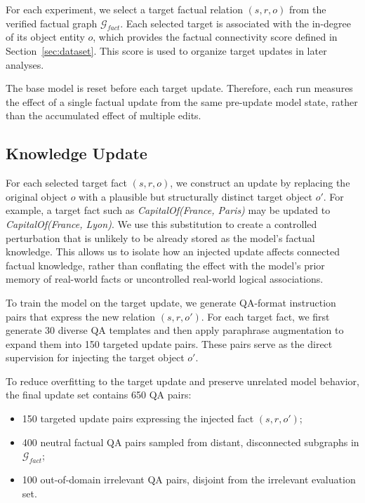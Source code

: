 For each experiment, we select a target factual relation $(s,r,o)$ from the verified factual graph $\mathcal{G}_{fact}$. Each selected target is associated with the in-degree of its object entity $o$, which provides the factual connectivity score defined in Section~\ref{sec:dataset}. This score is used to organize target updates in later analyses.

The base model is reset before each target update. Therefore, each run measures the effect of a single factual update from the same pre-update model state, rather than the accumulated effect of multiple edits.


\subsection{Knowledge Update}

For each selected target fact $(s,r,o)$, we construct an update by replacing the original object $o$ with a plausible but structurally distinct target object $o'$. For example, a target fact such as \textit{CapitalOf(France, Paris)} may be updated to \textit{CapitalOf(France, Lyon)}. We use this substitution to create a controlled perturbation that is unlikely to be already stored as the model's factual knowledge. This allows us to isolate how an injected update affects connected factual knowledge, rather than conflating the effect with the model's prior memory of real-world facts or uncontrolled real-world logical associations.

To train the model on the target update, we generate QA-format instruction pairs that express the new relation $(s,r,o')$. For each target fact, we first generate 30 diverse QA templates and then apply paraphrase augmentation to expand them into 150 targeted update pairs. These pairs serve as the direct supervision for injecting the target object $o'$.

To reduce overfitting to the target update and preserve unrelated model behavior, the final update set contains 650 QA pairs:

\begin{itemize}
    \setlength\itemsep{0em}
    \item 150 targeted update pairs expressing the injected fact $(s,r,o')$;
    \item 400 neutral factual QA pairs sampled from distant, disconnected subgraphs in $\mathcal{G}_{fact}$;
    \item 100 out-of-domain irrelevant QA pairs, disjoint from the irrelevant evaluation set.
\end{itemize}

